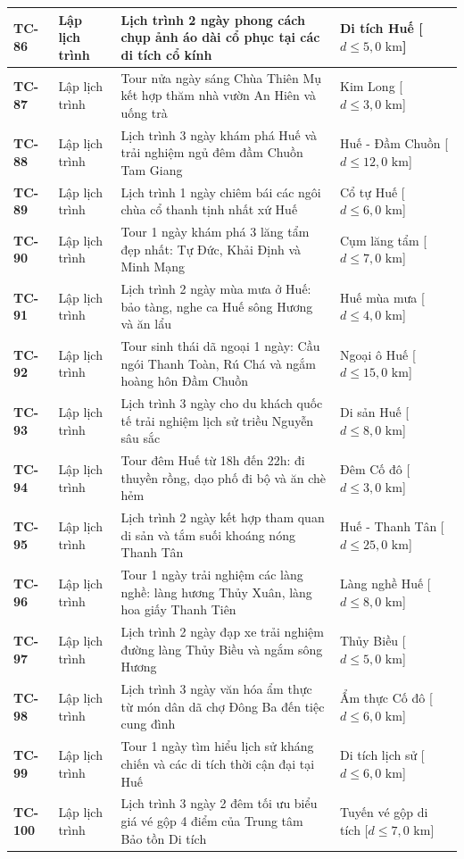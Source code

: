 \begin{longtable}{|>{\centering\arraybackslash\bfseries}p{1.35cm}|>{\raggedright\arraybackslash}p{2.6cm}|>{\raggedright\arraybackslash}p{6.35cm}|>{\raggedright\arraybackslash}p{4.3cm}|}
TC-86 & Lập lịch trình & Lịch trình 2 ngày phong cách chụp ảnh áo dài cổ phục tại các di tích cổ kính & Di tích Huế [$d \le 5{,}0\text{ km}$] \\ \hline
TC-87 & Lập lịch trình & Tour nửa ngày sáng Chùa Thiên Mụ kết hợp thăm nhà vườn An Hiên và uống trà & Kim Long [$d \le 3{,}0\text{ km}$] \\ \hline
TC-88 & Lập lịch trình & Lịch trình 3 ngày khám phá Huế và trải nghiệm ngủ đêm đầm Chuồn Tam Giang & Huế - Đầm Chuồn [$d \le 12{,}0\text{ km}$] \\ \hline
TC-89 & Lập lịch trình & Lịch trình 1 ngày chiêm bái các ngôi chùa cổ thanh tịnh nhất xứ Huế & Cổ tự Huế [$d \le 6{,}0\text{ km}$] \\ \hline
TC-90 & Lập lịch trình & Tour 1 ngày khám phá 3 lăng tẩm đẹp nhất: Tự Đức, Khải Định và Minh Mạng & Cụm lăng tẩm [$d \le 7{,}0\text{ km}$] \\ \hline
TC-91 & Lập lịch trình & Lịch trình 2 ngày mùa mưa ở Huế: bảo tàng, nghe ca Huế sông Hương và ăn lẩu & Huế mùa mưa [$d \le 4{,}0\text{ km}$] \\ \hline
TC-92 & Lập lịch trình & Tour sinh thái dã ngoại 1 ngày: Cầu ngói Thanh Toàn, Rú Chá và ngắm hoàng hôn Đầm Chuồn & Ngoại ô Huế [$d \le 15{,}0\text{ km}$] \\ \hline
TC-93 & Lập lịch trình & Lịch trình 3 ngày cho du khách quốc tế trải nghiệm lịch sử triều Nguyễn sâu sắc & Di sản Huế [$d \le 8{,}0\text{ km}$] \\ \hline
TC-94 & Lập lịch trình & Tour đêm Huế từ 18h đến 22h: đi thuyền rồng, dạo phố đi bộ và ăn chè hẻm & Đêm Cố đô [$d \le 3{,}0\text{ km}$] \\ \hline
TC-95 & Lập lịch trình & Lịch trình 2 ngày kết hợp tham quan di sản và tắm suối khoáng nóng Thanh Tân & Huế - Thanh Tân [$d \le 25{,}0\text{ km}$] \\ \hline
TC-96 & Lập lịch trình & Tour 1 ngày trải nghiệm các làng nghề: làng hương Thủy Xuân, làng hoa giấy Thanh Tiên & Làng nghề Huế [$d \le 8{,}0\text{ km}$] \\ \hline
TC-97 & Lập lịch trình & Lịch trình 2 ngày đạp xe trải nghiệm đường làng Thủy Biều và ngắm sông Hương & Thủy Biều [$d \le 5{,}0\text{ km}$] \\ \hline
TC-98 & Lập lịch trình & Lịch trình 3 ngày văn hóa ẩm thực từ món dân dã chợ Đông Ba đến tiệc cung đình & Ẩm thực Cố đô [$d \le 6{,}0\text{ km}$] \\ \hline
TC-99 & Lập lịch trình & Tour 1 ngày tìm hiểu lịch sử kháng chiến và các di tích thời cận đại tại Huế & Di tích lịch sử [$d \le 6{,}0\text{ km}$] \\ \hline
TC-100 & Lập lịch trình & Lịch trình 3 ngày 2 đêm tối ưu biểu giá vé gộp 4 điểm của Trung tâm Bảo tồn Di tích & Tuyến vé gộp di tích [$d \le 7{,}0\text{ km}$] \\ \hline
\end{longtable}
\endgroup

